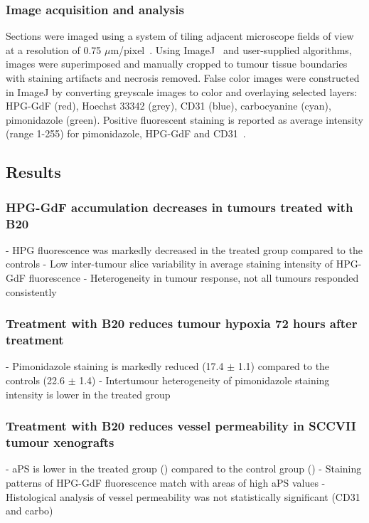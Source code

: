 \subsubsection{Image acquisition and analysis}
Sections were imaged using a system of tiling adjacent microscope fields of view at a resolution of 0.75 $\mu$m/pixel~\cite{Kyle:2007ch}.
Using ImageJ~\cite{Collins:2007jr} and user-supplied algorithms, images were superimposed and manually cropped to tumour tissue boundaries with staining artifacts and necrosis removed.
False color images were constructed in ImageJ by converting greyscale images to color and overlaying selected layers: \ac{HPG-GdF} (red), Hoechst 33342 (grey), CD31 (blue), carbocyanine (cyan), pimonidazole (green).
Positive fluorescent staining is reported as average intensity (range 1-255) for pimonidazole, \ac{HPG-GdF} and CD31~.

\subsection{Results}

\subsubsection{HPG-GdF accumulation decreases in tumours treated with B20}

- HPG fluorescence was markedly decreased in the treated group compared to the controls
- Low inter-tumour slice variability in average staining intensity of \ac{HPG-GdF} fluorescence 
- Heterogeneity in tumour response, not all tumours responded consistently

\subsubsection{Treatment with B20 reduces tumour hypoxia 72 hours after treatment}

- Pimonidazole staining is markedly reduced (17.4 $\pm$ 1.1) compared to the controls (22.6 $\pm$ 1.4)
- Intertumour heterogeneity of pimonidazole staining intensity is lower in the treated group

\subsubsection{Treatment with B20 reduces vessel permeability in SCCVII tumour xenografts}

- \ac{aPS} is lower in the treated group () compared to the control group ()
- Staining patterns of \ac{HPG-GdF} fluorescence match with areas of high \ac{aPS} values
- Histological analysis of vessel permeability was not statistically significant (CD31 and carbo)

